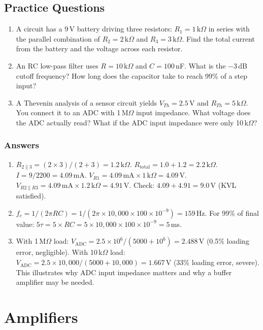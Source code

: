 \documentclass[11pt,letterpaper,twoside,openany]{book}
\begin{document}
\section{Practice Questions}
\begin{enumerate}[leftmargin=1.5em]
\item A circuit has a 9\,V battery driving three resistors: $R_1 = 1\,\text{k}\Omega$ in series with the parallel combination of $R_2 = 2\,\text{k}\Omega$ and $R_3 = 3\,\text{k}\Omega$. Find the total current from the battery and the voltage across each resistor.
\item An RC low-pass filter uses $R = 10\,\text{k}\Omega$ and $C = 100$\,nF. What is the $-3$\,dB cutoff frequency? How long does the capacitor take to reach 99\% of a step input?
\item A Thevenin analysis of a sensor circuit yields $V_{Th} = 2.5$\,V and $R_{Th} = 5\,\text{k}\Omega$. You connect it to an ADC with 1\,M$\Omega$ input impedance. What voltage does the ADC actually read? What if the ADC input impedance were only 10\,k$\Omega$?
\end{enumerate}

\subsection{Answers}
\begin{enumerate}[leftmargin=1.5em]
\item $R_{2\|3} = (2 \times 3)/(2 + 3) = 1.2\,\text{k}\Omega$. $R_{\text{total}} = 1.0 + 1.2 = 2.2\,\text{k}\Omega$. $I = 9/2200 = 4.09$\,mA. $V_{R1} = 4.09\,\text{mA} \times 1\,\text{k}\Omega = 4.09$\,V. $V_{R2\|R3} = 4.09\,\text{mA} \times 1.2\,\text{k}\Omega = 4.91$\,V. Check: $4.09 + 4.91 = 9.0$\,V (KVL satisfied).
\item $f_c = 1/(2\pi RC) = 1/(2\pi \times 10{,}000 \times 100 \times 10^{-9}) = 159$\,Hz. For 99\% of final value: $5\tau = 5 \times RC = 5 \times 10{,}000 \times 100 \times 10^{-9} = 5$\,ms.
\item With 1\,M$\Omega$ load: $V_{\text{ADC}} = 2.5 \times 10^6/(5000 + 10^6) = 2.488$\,V (0.5\% loading error, negligible). With 10\,k$\Omega$ load: $V_{\text{ADC}} = 2.5 \times 10{,}000/(5000 + 10{,}000) = 1.667$\,V (33\% loading error, severe). This illustrates why ADC input impedance matters and why a buffer amplifier may be needed.
\end{enumerate}


\chapter{Amplifiers}
\label{ch:amplifiers}
\end{document}
